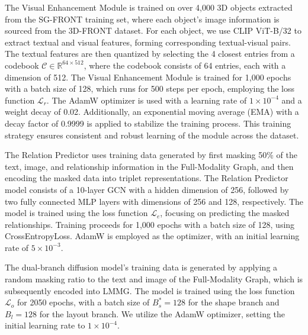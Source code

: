 The Visual Enhancement Module is trained on over 4,000 3D objects extracted from the SG-FRONT training set, where each object’s image information is sourced from the 3D-FRONT dataset. For each object, we use CLIP ViT-B/32 to extract textual and visual features, forming corresponding textual-visual pairs. 
The textual features are then quantized by selecting the 4 closest entries from a codebook \( \mathcal{C} \in \mathbb{R}^{64 \times 512} \), where the codebook consists of 64 entries, each with a dimension of 512.
The Visual Enhancement Module is trained for 1,000 epochs with a batch size of 128, which runs for 500 steps per epoch, employing the loss function \( \mathcal{L}_r \). The AdamW optimizer is used with a learning rate of \( 1 \times 10^{-4} \) and a weight decay of 0.02. Additionally, an exponential moving average (EMA) with a decay factor of 0.9999 is applied to stabilize the training process. This training strategy ensures consistent and robust learning of the module across the dataset.

The Relation Predictor uses training data generated by first masking 50\% of the text, image, and relationship information in the Full-Modality Graph, and then encoding the masked data into triplet representations.
The Relation Predictor model consists of a 10-layer GCN with a hidden dimension of 256, followed by two fully connected MLP layers with dimensions of 256 and 128, respectively. The model is trained using the loss function \( \mathcal{L}_e \), focusing on predicting the masked relationships.
Training proceeds for 1,000 epochs with a batch size of 128, using CrossEntropyLoss. AdamW is employed as the optimizer, with an initial learning rate of \( 5 \times 10^{-3} \).

The dual-branch diffusion model's training data is generated by applying a random masking ratio to the text and image of the Full-Modality Graph, which is subsequently encoded into LMMG. 
The model is trained using the loss function \( \mathcal{L}_o \) for 2050 epochs, with a batch size of \( B^*_s = 128 \) for the shape branch and \( B_l = 128 \) for the layout branch.
We utilize the AdamW optimizer, setting the initial learning rate to \( 1 \times 10^{-4} \).

